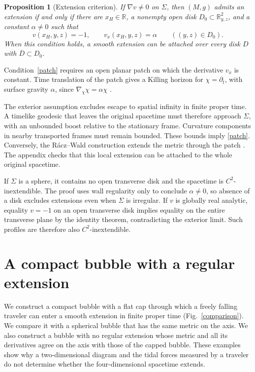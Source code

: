\documentclass[12pt]{article}
\newtheorem{proposition}{Proposition}
\newcommand{\R}{\mathbb R}
\begin{document}
\begin{proposition}[Extension criterion]
\label{criterion}
If \(\nabla v\ne0\) on \(\Sigma\), then \((M,g)\) admits an extension if and only if
there are \(x_H\in\R\), a nonempty open disk \(D_0\subset\R^2_{y,z}\),
and a constant \(\alpha\ne0\) such that
\begin{equation}
 v(x_H,y,z)=-1,\qquad v_x(x_H,y,z)=\alpha
 \qquad ((y,z)\in D_0).
 \label{patch}
\end{equation}
When this condition holds, a smooth extension can be attached over every
disk \(D\) with \(\overline D\subset D_0\).
\end{proposition}

Condition~\eqref{patch} requires an open planar patch on which the
derivative \(v_x\) is constant. Time translation of the patch gives a
Killing horizon for \(\chi=\partial_t\), with
surface gravity \(\alpha\), since \(\nabla_\chi\chi=\alpha\chi\)
\cite[Eq.~(1)]{RaczWald1996}.

The exterior assumption excludes escape to spatial infinity in finite
proper time. A timelike geodesic that leaves the original spacetime must
therefore approach \(\Sigma\), with an unbounded boost relative to the
stationary frame. Curvature components in nearby transported frames must
remain bounded. These bounds imply \eqref{patch}.
Conversely, the R\'acz--Wald construction extends the metric through the
patch \cite{RaczWald1992}. The appendix checks that this local extension
can be attached to the whole original spacetime.

If \(\Sigma\) is a sphere, it contains no open transverse disk and the
spacetime is \(C^2\)-inextendible. The proof uses wall regularity only to
conclude \(\alpha\ne0\), so absence of a disk excludes extensions even
when \(\Sigma\) is irregular.
If \(v\) is globally real analytic, equality \(v=-1\) on an open transverse
disk implies equality on the entire transverse plane by the identity
theorem, contradicting the exterior limit. Such profiles are therefore
also \(C^2\)-inextendible.

\section{A compact bubble with a regular extension}
\label{compact}

We construct a compact bubble with a flat cap through which a freely
falling traveler can enter a smooth extension in finite proper time
(Fig.~\ref{comparison}). We compare it with a spherical bubble that has
the same metric on the axis. We also construct a bubble with no regular
extension whose metric and all its derivatives agree on the axis with
those of the capped bubble. These examples show why a
two-dimensional diagram and the tidal forces measured by a traveler do
not determine whether the four-dimensional spacetime extends.
\end{document}
